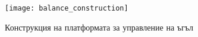 \begin{figure}[htpb!]
    \centering
    \texttt{[image: balance\_construction]}
    \caption{Конструкция на платформата за управление на ъгъл}
    \label{fig:balance_construction}
\end{figure}

\FloatBarrier

